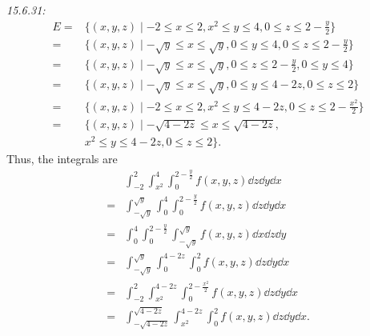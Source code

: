 \documentclass[8pt,twocolumn]{article}
\begin{document}
\begin{Answer}[number=20]
  \emph{15.6.31:}
  \begin{align*}
    E =&  \{ (x,y,z) \mid -2 \le x \le 2, x^2 \le y \le 4,  0 \le z \le 2-\frac{y}{2} \} \\
    = &\{ (x,y,z) \mid -\sqrt{y} \le x\le \sqrt{y}, 0 \le y \le 4, 0 \le z \le 2-\frac{y}{2} \} \\
    = &\{ (x,y,z) \mid -\sqrt{y} \le x\le \sqrt{y}, 0 \le z \le 2-\frac{y}{2}, 0 \le y \le 4 \} \\
    = &\{ (x,y,z) \mid -\sqrt{y} \le x\le \sqrt{y}, 0 \le y \le 4-2z, 0 \le z \le 2 \} \\
    = &\{ (x,y,z) \mid -2 \le x \le 2, x^2 \le y \le 4-2z, 0 \le z \le 2-\frac{x^2}{2} \} \\
    = &\{ (x,y,z) \mid -\sqrt{4-2z} \le x\le \sqrt{4-2z},\\ &x^2 \le y \le
    4-2z, 0 \le z \le 2 \}.
  \end{align*}
  Thus, the integrals are
  \begin{align*}
    &\int_{-2}^2 \int_{x^2}^4
    \int_0^{2-\frac{y}{2}} f(x,y,z) \dd{z}\dd{y}\dd{x} \\
 = &\int_{-\sqrt{y}}^{\sqrt{y}} \int_0^4 \int_0^{2-\frac{y}{2}} f(x,y,z)\dd{z}\dd{y}\dd{x} \\
 = &\int_0^4 \int_0^{2-\frac{y}{2}} \int_{-\sqrt{y}}^{\sqrt{y}}
    f(x,y,z)\dd{x}\dd{z}\dd{y} \\
 = &\int_{-\sqrt{y}}^{\sqrt{y}} \int_0^{4-2z} \int_0^2 f(x,y,z) \dd{z}\dd{y}\dd{x} \\
 = &\int_{-2}^2 \int_{x^2}^{4-2z} \int_0^{2-\frac{x^2}{2}} f(x,y,z) \dd{z}\dd{y}\dd{x} \\
 = &\int_{-\sqrt{4-2z}}^{\sqrt{4-2z}} \int_{x^2}^{4-2z} \int_0^2 f(x,y,z) \dd{z}\dd{y}\dd{x}.
  \end{align*}
\end{Answer}
\end{document}
